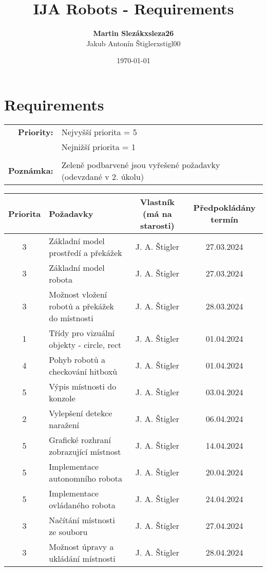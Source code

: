\documentclass{article}
\title{IJA Robots - Requirements}
\author{
    \begin{tabular}{r l}
        \textbf{Martin Slezák} & \textbf{xsleza26} \\
        Jakub Antonín Štigler  & xstigl00
    \end{tabular}
}
\date{\today}
\begin{document}
\maketitle

\newpage

\section{Requirements}
\begin{tabular}{r l}
    \textbf{Priority:} & Nejvyšší priorita = 5 \\
        & Nejnižší priorita = 1 \\ \\
    \textbf{Poznámka:} &
        \cellcolor{green!30}Zeleně podbarvené jsou vyřešené požadavky
            (odevzdané v 2. úkolu)
\end{tabular}

\vspace{\baselineskip}

\begin{table}[h]
    \centering
    \begin{tabular}{ |c|>{\raggedright\arraybackslash}p{3.5cm}|c|c| }
        \hline
        \rowcolor{blue!25}Priorita & Požadavky & Vlastník (má na starosti) &
            Předpokládány termín \\
        \hline
        \rowcolor{green!25}3 & Základní model prostředí a překážek &
            J. A. Štigler & 27.03.2024 \\
        \hline
        \rowcolor{green!25}3 & Základní model robota & J. A. Štigler &
            27.03.2024 \\
        \hline
        \rowcolor{green!25}3 & Možnost vložení robotů a překážek do místnosti &
            J. A. Štigler & 28.03.2024 \\
        \hline
        \rowcolor{green!25}1 & Třídy pro vizuální objekty - circle, rect &
            J. A. Štigler & 01.04.2024 \\
        \hline
        \rowcolor{green!25}4 & Pohyb robotů a checkování hitboxů &
            J. A. Štigler & 01.04.2024 \\
        \hline
        \rowcolor{green!25}5 & Výpis místnosti do konzole & J. A. Štigler &
            03.04.2024 \\
        \hline
        2 & Vylepšení detekce naražení & J. A. Štigler & 06.04.2024 \\
        \hline
        5 & Grafické rozhraní zobrazující místnost & J. A. Štigler &
            14.04.2024 \\
        \hline
        5 & Implementace autonomního robota & J. A. Štigler & 20.04.2024 \\
        \hline
        5 & Implementace ovládaného robota & J. A. Štigler & 24.04.2024 \\
        \hline
        3 & Načítání místnosti ze souboru & J. A. Štigler & 27.04.2024 \\
        \hline
        3 & Možnost úpravy a ukládání místnosti & J. A. Štigler & 28.04.2024 \\
        \hline
    \end{tabular}
\end{table}
\end{document}
